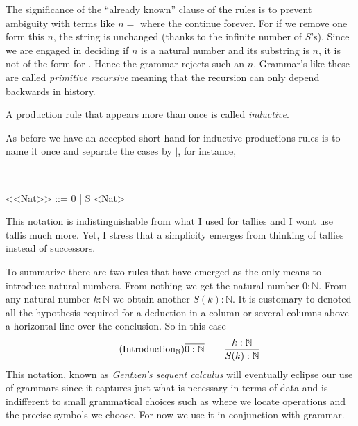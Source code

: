 The significance of the ``already known'' clause of the rules is to prevent ambiguity 
with terms like $n=$ where the  continue forever.
For if we remove one  form this $n$, the string is unchanged (thanks to 
the infinite number of $S$'s).  Since we are engaged in deciding if $n$ is a natural number and its substring 
is $n$, it is not of the form  for .  Hence the grammar 
rejects such an $n$.  Grammar's like these are called \emph{primitive recursive}
meaning that the recursion can only depend backwards 
in history.

\begin{definition}
    A production rule that appears more than once is called \emph{inductive}.
\end{definition}

As before we have an accepted short hand for inductive productions rules is to name it once 
and separate the cases by $\mid$, for instance,
\begin{center}
 \\
\begin{Gcode}[]
<<Nat>> ::= 0 
        | S <Nat>
\end{Gcode}
\end{center}
This notation is indistinguishable from what I used for tallies and 
I wont use tallis much more.  Yet, I stress that a simplicity emerges from thinking 
of tallies instead of successors.

To summarize there are two rules that have emerged as the only means to introduce 
natural numbers. From nothing we get the natural number $0:\mathbb{N}$.
From any natural number $k:\mathbb{N}$ we obtain another $S(k):\mathbb{N}$.
It is customary to denoted all the hypothesis required for a deduction in a column or 
several columns above a horizontal line over the conclusion.  So in this case 
\begin{gather}
    \tag{Introduction$_{\mathbb{N}}$}
    \overline{0:\mathbb{N}}
    \qquad
    \frac{k:\mathbb{N}}{S(k):\mathbb{N}}
\end{gather}
This notation, known as \emph{Gentzen's sequent calculus} will eventually
eclipse our use of grammars since it captures just what is necessary in terms of
data and is indifferent to small grammatical choices such as where we locate
operations and the precise symbols we choose.  For now we use it in conjunction
with grammar.

